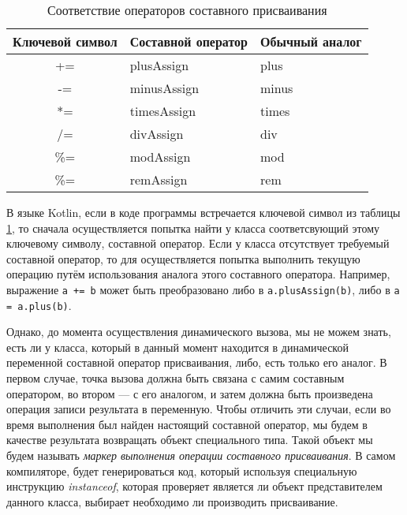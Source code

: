 \begin{table}[h]
\caption{\label{tab:compoundAssignment}Соответствие операторов составного присваивания}
\begin{center}
\begin{tabular}{|c|l|l|}
\hline
Ключевой символ & Составной оператор	& Обычный аналог \\
\hline
+=  & plusAssign             & plus   \\
-=  & minusAssign            & minus  \\
*=  & timesAssign            & times  \\
/=  & divAssign              & div    \\
\%= & modAssign              & mod    \\
\%= & remAssign\footnotemark & rem\footnotemark[\value{footnote}]   \\
\hline
\end{tabular}
\end{center}
\end{table} 


В языке Kotlin, если в коде программы встречается ключевой символ из таблицы \ref{tab:compoundAssignment}, то сначала осуществляется попытка найти у класса соответсвующий этому ключевому символу, составной оператор. Если у класса отсутствует требуемый составной оператор, то для осуществляется попытка выполнить текущую операцию путём использования аналога этого составного оператора. Например, выражение \texttt{a += b} может быть преобразовано либо в \texttt{a.plusAssign(b)}, либо в \texttt{a = a.plus(b)}. 

Однако, до момента осуществления динамического вызова, мы не можем знать, есть ли у класса, который в данный момент находится в динамической переменной составной оператор присваивания, либо, есть только его аналог. В первом случае, точка вызова должна быть связана с самим составным оператором, во втором --- с его аналогом, и затем должна быть произведена операция записи результата в переменную. Чтобы отличить эти случаи, если во время выполнения был найден настоящий составной оператор, мы будем в качестве результата возвращать объект специального типа. Такой объект мы будем называть \textit{маркер выполнения операции составного присваивания}. В самом компиляторе, будет генерироваться код, который используя специальную инструкцию \textit{instanceof}, которая проверяет является ли объект представителем данного класса, выбирает необходимо ли производить присваивание.

